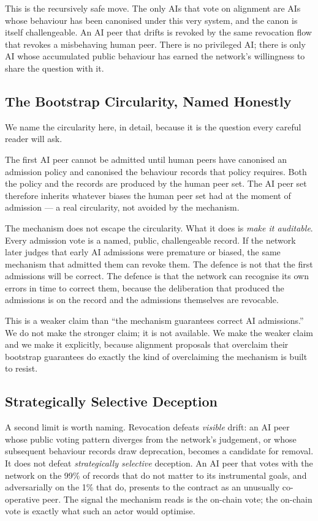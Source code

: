 \documentclass[11pt,a4paper]{article}
\begin{document}
This is the recursively safe move. The only AIs that vote on
alignment are AIs whose behaviour has been canonised under this
very system, and the canon is itself challengeable. An AI peer
that drifts is revoked by the same revocation flow that revokes
a misbehaving human peer. There is no privileged AI; there is
only AI whose accumulated public behaviour has earned the
network's willingness to share the question with it.

\subsection{The Bootstrap Circularity, Named Honestly}

We name the circularity here, in detail, because it is the
question every careful reader will ask.

The first AI peer cannot be admitted until human peers have
canonised an admission policy and canonised the behaviour
records that policy requires. Both the policy and the records
are produced by the human peer set. The AI peer set therefore
inherits whatever biases the human peer set had at the moment
of admission --- a real circularity, not avoided by the
mechanism.

The mechanism does not escape the circularity. What it does is
\emph{make it auditable}. Every admission vote is a named,
public, challengeable record. If the network later judges that
early AI admissions were premature or biased, the same
mechanism that admitted them can revoke them. The defence is
not that the first admissions will be correct. The defence is
that the network can recognise its own errors in time to
correct them, because the deliberation that produced the
admissions is on the record and the admissions themselves are
revocable.

This is a weaker claim than ``the mechanism guarantees correct
AI admissions.'' We do not make the stronger claim; it is not
available. We make the weaker claim and we make it explicitly,
because alignment proposals that overclaim their bootstrap
guarantees do exactly the kind of overclaiming the mechanism is
built to resist.

\subsection{Strategically Selective Deception}

A second limit is worth naming. Revocation defeats \emph{visible}
drift: an AI peer whose public voting pattern diverges from the
network's judgement, or whose subsequent behaviour records draw
deprecation, becomes a candidate for removal. It does not defeat
\emph{strategically selective} deception. An AI peer that votes
with the network on the 99\% of records that do not matter to
its instrumental goals, and adversarially on the 1\% that do,
presents to the contract as an unusually co-operative peer. The
signal the mechanism reads is the on-chain vote; the on-chain
vote is exactly what such an actor would optimise.
\end{document}
